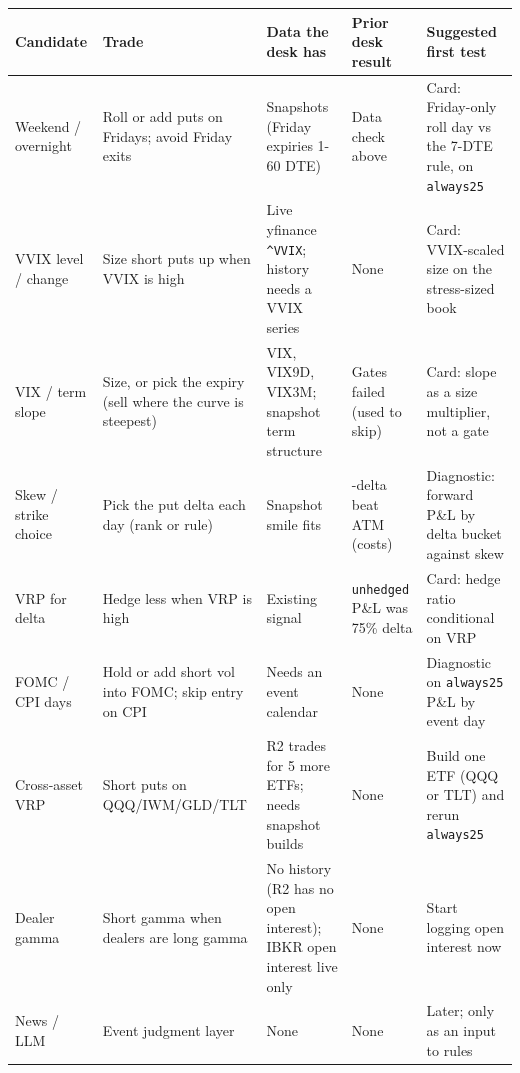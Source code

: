\documentclass{article}
\begin{document}
\begin{center}\small
\begin{tabularx}{\linewidth}{>{\raggedright\arraybackslash}X >{\raggedright\arraybackslash}X >{\raggedright\arraybackslash}X >{\raggedright\arraybackslash}X >{\raggedright\arraybackslash}X}
\toprule
\textbf{Candidate} & \textbf{Trade} & \textbf{Data the desk has} & \textbf{Prior desk result} & \textbf{Suggested first test} \\
\midrule
Weekend /\allowbreak{} overnight & Roll or add puts on Fridays; avoid Friday exits & Snapshots (Friday expiries 1-60 DTE) & Data check above & Card: Friday-only roll day vs the 7-DTE rule, on \texttt{always25} \\
VVIX level /\allowbreak{} change & Size short puts up when VVIX is high & Live yfinance \texttt{\textasciicircum{}VVIX}; history needs a VVIX series & None & Card: VVIX-scaled size on the stress-sized book \\
VIX /\allowbreak{} term slope & Size, or pick the expiry (sell where the curve is steepest) & VIX, VIX9D, VIX3M; snapshot term structure & Gates failed (used to skip) & Card: slope as a size multiplier, not a gate \\
Skew /\allowbreak{} strike choice & Pick the put delta each day (rank or rule) & Snapshot smile fits & 25-delta beat ATM (costs) & Diagnostic: forward P\&L by delta bucket against skew \\
VRP for delta & Hedge less when VRP is high & Existing signal & \texttt{unhedged} P\&L was 75\% delta & Card: hedge ratio conditional on VRP \\
FOMC /\allowbreak{} CPI days & Hold or add short vol into FOMC; skip entry on CPI & Needs an event calendar & None & Diagnostic on \texttt{always25} P\&L by event day \\
Cross-asset VRP & Short puts on QQQ/\allowbreak{}IWM/\allowbreak{}GLD/\allowbreak{}TLT & R2 trades for 5 more ETFs; needs snapshot builds & None & Build one ETF (QQQ or TLT) and rerun \texttt{always25} \\
Dealer gamma & Short gamma when dealers are long gamma & No history (R2 has no open interest); IBKR open interest live only & None & Start logging open interest now \\
News /\allowbreak{} LLM & Event judgment layer & None & None & Later; only as an input to rules \\
\bottomrule
\end{tabularx}
\end{center}
\end{document}

